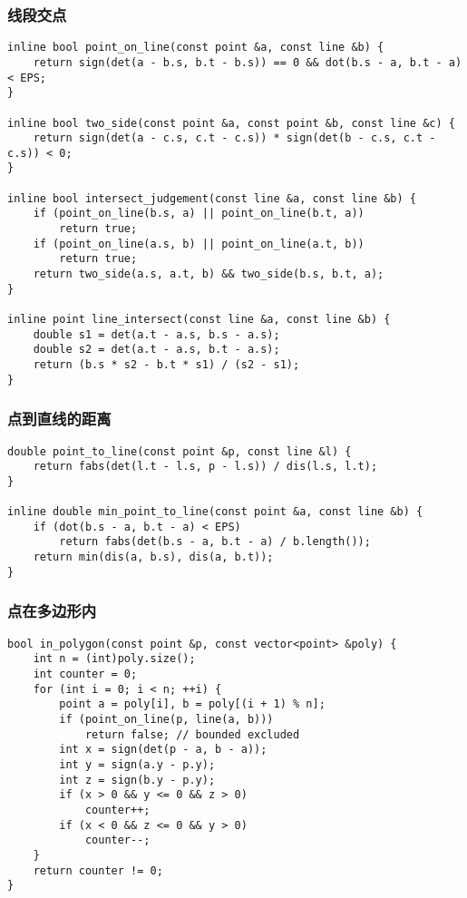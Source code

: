\documentclass{article}
\begin{document}
\subsubsection{线段交点}

\begin{lstlisting}
inline bool point_on_line(const point &a, const line &b) {
    return sign(det(a - b.s, b.t - b.s)) == 0 && dot(b.s - a, b.t - a) < EPS;
}

inline bool two_side(const point &a, const point &b, const line &c) {
    return sign(det(a - c.s, c.t - c.s)) * sign(det(b - c.s, c.t - c.s)) < 0;
}

inline bool intersect_judgement(const line &a, const line &b) {
    if (point_on_line(b.s, a) || point_on_line(b.t, a))
        return true;
    if (point_on_line(a.s, b) || point_on_line(a.t, b))
        return true;
    return two_side(a.s, a.t, b) && two_side(b.s, b.t, a);
}

inline point line_intersect(const line &a, const line &b) {
    double s1 = det(a.t - a.s, b.s - a.s);
    double s2 = det(a.t - a.s, b.t - a.s);
    return (b.s * s2 - b.t * s1) / (s2 - s1);
}
\end{lstlisting}

\subsubsection{点到直线的距离}

\begin{lstlisting}
double point_to_line(const point &p, const line &l) {
    return fabs(det(l.t - l.s, p - l.s)) / dis(l.s, l.t);
}

inline double min_point_to_line(const point &a, const line &b) {
    if (dot(b.s - a, b.t - a) < EPS)
        return fabs(det(b.s - a, b.t - a) / b.length());
    return min(dis(a, b.s), dis(a, b.t));
}
\end{lstlisting}

\subsubsection{点在多边形内}

\begin{lstlisting}
bool in_polygon(const point &p, const vector<point> &poly) {
    int n = (int)poly.size();
    int counter = 0;
    for (int i = 0; i < n; ++i) {
        point a = poly[i], b = poly[(i + 1) % n];
        if (point_on_line(p, line(a, b)))
            return false; // bounded excluded
        int x = sign(det(p - a, b - a));
        int y = sign(a.y - p.y);
        int z = sign(b.y - p.y);
        if (x > 0 && y <= 0 && z > 0)
            counter++;
        if (x < 0 && z <= 0 && y > 0)
            counter--;
    }
    return counter != 0;
}
\end{lstlisting}
\end{document}
